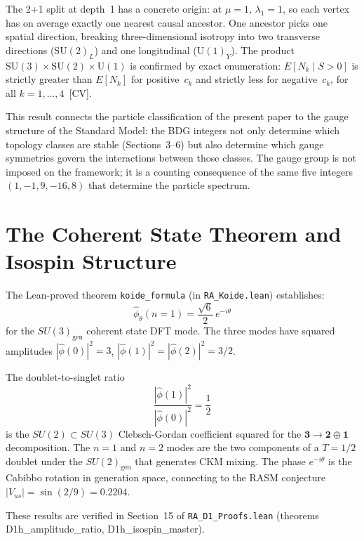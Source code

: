 \documentclass[11pt,a4paper]{article}
\begin{document}
\noindent The 2+1 split at depth~1 has a concrete origin: at $\mu=1$, $\lambda_1 = 1$, so each vertex has on average exactly one nearest causal ancestor. One ancestor picks one spatial direction, breaking three-dimensional isotropy into two transverse directions ($\mathrm{SU}(2)_L$) and one longitudinal ($\mathrm{U}(1)_Y$). The product $\mathrm{SU}(3) \times \mathrm{SU}(2) \times \mathrm{U}(1)$ is confirmed by exact enumeration: $E[N_k \mid S > 0]$ is strictly greater than $E[N_k]$ for positive~$c_k$ and strictly less for negative~$c_k$, for all $k = 1,\ldots,4$~[CV].

This result connects the particle classification of the present paper to the gauge structure of the Standard Model: the BDG integers not only determine which topology classes are stable (Sections~3--6) but also determine which gauge symmetries govern the interactions between those classes. The gauge group is not imposed on the framework; it is a counting consequence of the same five integers $(1,-1,9,-16,8)$ that determine the particle spectrum.

\section{The Coherent State Theorem and Isospin Structure}
\label{sec:D1h}

The Lean-proved theorem \texttt{koide\_formula}
(in \texttt{RA\_Koide.lean}) establishes:
\[
  \hat{\phi}_\theta(n=1) = \frac{\sqrt{6}}{2}\,e^{-i\theta}
\]
for the $SU(3)_{\mathrm{gen}}$ coherent state DFT mode. The
three modes have squared amplitudes
$|\hat{\phi}(0)|^2 = 3$, $|\hat{\phi}(1)|^2 = |\hat{\phi}(2)|^2 = 3/2$.

The doublet-to-singlet ratio
\[
  \frac{|\hat{\phi}(1)|^2}{|\hat{\phi}(0)|^2} = \frac{1}{2}
\]
is the $SU(2) \subset SU(3)$ Clebsch-Gordan coefficient squared for
the $\mathbf{3} \to \mathbf{2} \oplus \mathbf{1}$ decomposition.
The $n=1$ and $n=2$ modes are the two components of a $T=1/2$ doublet
under the $SU(2)_{\mathrm{gen}}$ that generates CKM mixing. The
phase $e^{-i\theta}$ is the Cabibbo rotation in generation space,
connecting to the RASM conjecture $|V_{us}| = \sin(2/9) = 0.2204$.

These results are verified in Section~15 of \texttt{RA\_D1\_Proofs.lean}
(theorems D1h\_amplitude\_ratio, D1h\_isospin\_master).

\end{document}

